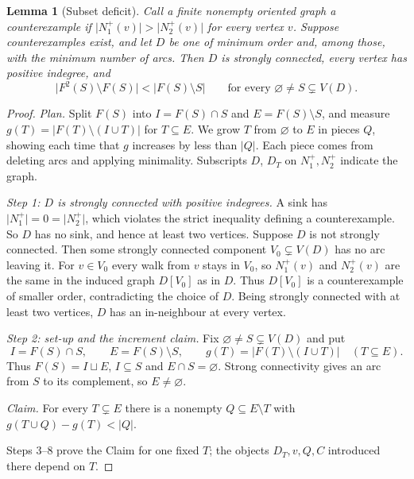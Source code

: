\documentclass[11pt]{article}
\newtheorem{lemma}[theorem]{Lemma}
\theoremstyle{remark}
\newcommand{\abs}[1]{\lvert #1\rvert}
\begin{document}
\begin{lemma}[Subset deficit]
\label{lem:subset-deficit}
Call a finite nonempty oriented graph a \emph{counterexample} if
$\abs{N_1^+(v)}>\abs{N_2^+(v)}$ for every vertex $v$.  Suppose
counterexamples exist, and let $D$ be one of minimum order and, among those,
with the minimum number of arcs.  Then $D$ is strongly connected,
every vertex has positive indegree, and
\begin{equation}
\label{eq:subset-deficit}
  \abs{F^2(S)\setminus F(S)}<\abs{F(S)\setminus S}
  \qquad\text{for every }\varnothing\ne S\subsetneq V(D).
\end{equation}
\end{lemma}

\begin{proof}
\emph{Plan.}  Split $F(S)$ into $I=F(S)\cap S$ and $E=F(S)\setminus S$, and
measure $g(T)=\abs{F(T)\setminus(I\cup T)}$ for $T\subseteq E$.  We grow $T$
from $\varnothing$ to $E$ in pieces $Q$, showing each time that $g$ increases
by less than $\abs Q$.  Each piece comes from deleting arcs and applying
minimality.  Subscripts $D$, $D_T$ on $N_1^+,N_2^+$ indicate the graph.

\smallskip\noindent\emph{Step 1: $D$ is strongly connected with positive
indegrees.}
A sink has $\abs{N_1^+}=0=\abs{N_2^+}$, which violates the strict inequality
defining a counterexample.  So $D$ has no sink, and hence at least two
vertices.  Suppose $D$ is not strongly connected.  Then some strongly
connected component $V_0\subsetneq V(D)$ has no arc leaving it.  For
$v\in V_0$ every walk from $v$ stays in $V_0$, so $N_1^+(v)$ and $N_2^+(v)$
are the same in the induced graph $D[V_0]$ as in $D$.  Thus $D[V_0]$ is a
counterexample of smaller order, contradicting the choice of $D$.  Being
strongly connected with at least two vertices, $D$ has an in-neighbour at
every vertex.

\smallskip\noindent\emph{Step 2: set-up and the increment claim.}
Fix $\varnothing\ne S\subsetneq V(D)$ and put
\[
  I=F(S)\cap S,\qquad E=F(S)\setminus S,
  \qquad g(T)=\abs{F(T)\setminus(I\cup T)}\quad(T\subseteq E).
\]
Thus $F(S)=I\sqcup E$, $I\subseteq S$ and $E\cap S=\varnothing$.  Strong
connectivity gives an arc from $S$ to its complement, so $E\ne\varnothing$.

\emph{Claim.} For every $T\subsetneq E$ there is a nonempty
$Q\subseteq E\setminus T$ with $g(T\cup Q)-g(T)<\abs Q$.

Steps 3--8 prove the Claim for one fixed $T$; the objects $D_T,v,Q,C$
introduced there depend on $T$.


\end{proof}
\end{document}

